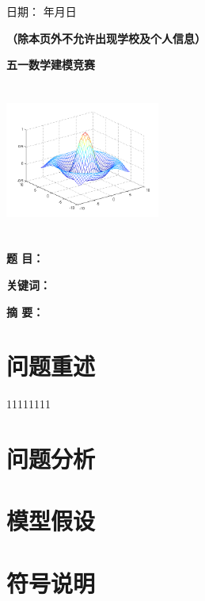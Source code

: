 \documentclass[withoutpreface,bwprint]{cumcmthesis}
\begin{document}
          

\hfill 日期： \underbar{\qquad}年\underbar{\qquad}月\underbar{\qquad}日
\noindent 

\noindent \underbar{}

\noindent \textbf{}

\noindent \textbf{}

\noindent \hfill \textbf{（除本页外不允许出现学校及个人信息）\eject }

\noindent \begin{center}
	{\huge \textbf{五一数学建模竞赛}} 
\end{center}

\begin{center}
	\noindent \textbf{\includegraphics*[width=2in, height=2in]{image2}}
\end{center}


\noindent \textbf{}
\begin{center}
	\noindent \textbf{ 题 目： \underbar{\qquad\qquad\qquad\qquad\qquad}}
\end{center}



\noindent \textbf{关键词：}

\noindent \textbf{摘  要：}

	\newpage
	\tableofcontents
	\newpage
	
	\section{问题重述}
	11111111
	
	\section{问题分析}
	
	
	\section{模型假设}
	
	
	\section{符号说明}
	
\end{document}
